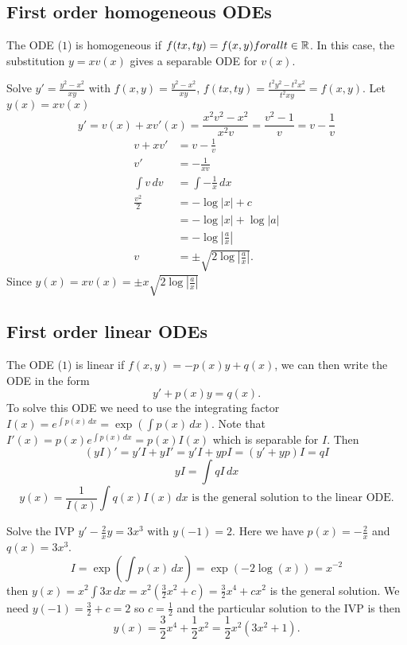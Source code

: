 \documentclass[10pt, a4paper]{article}
\begin{document}
\subsection{First order homogeneous ODEs}
The ODE ($1$) is homogeneous if $f(tx, ty) = f(x,  y)\\forall t \in \mathbb{R}$.
In this case,
the substitution $y = xv(x)$ gives a separable ODE for $v(x)$.

\begin{example}
    Solve $y' = \frac{y ^ 2 - x ^ 2}{xy}$
    with $f(x, y) = \frac{y ^ 2 - x ^ 2}{xy}$, $f(tx, ty) = \frac{t ^ 2y ^ 2 - t ^ 2 x ^ 2}{t ^ 2xy} = f(x, y)$.
    Let $y(x) = xv(x)$
    \[
    y' = v(x) + xv'(x) = \frac{x ^ 2 v ^ 2 - x ^ 2}{x ^ 2 v} = \frac{v ^ 2 - 1}{v} = v - \frac{1}{v}
    \]
    \begin{align*}
        v + xv' &= v - \frac{1}{v} \\
        v' &= -\frac{1}{xv} \\
        \int v\,dv &= \int -\frac{1}{x}\,dx \\
        \frac{v ^ 2}{2} &= -\log|x| + c \\
        &= -\log|x| + \log|a| \\
        &= -\log\left|\frac{a}{x}\right| \\
        v &= \pm\sqrt{2\log\left|\frac{a}{x}\right|}.
    \end{align*}
    Since $y(x) = xv(x) = \pm x\sqrt{2\log\left|\frac{a}{x}\right|}$
\end{example}

\subsection{First order linear ODEs}
The ODE ($1$) is linear if $f(x, y) = -p(x)y + q(x)$,
we can then write the ODE in the form
\[
y' + p(x)y = q(x).
\]
To solve this ODE we need to use the integrating factor $I(x) = e ^ {\int p(x)\,dx} = \exp\left(\int p(x)\,dx\right)$.
Note that $I'(x) = p(x)e ^ {\int p(x)\,dx} = p(x)I(x)$ which is separable for $I$.
Then
\[
(yI)' = y'I + yI' = y'I + ypI = (y' + yp)I = qI
\]
\[
yI = \int qI\,dx
\]
\[
y(x) = \frac{1}{I(x)}\int q(x)I(x)\,dx\text{ is the general solution to the linear ODE}.
\]
\begin{example}
    Solve the IVP $y' - \frac{2}{x}y = 3x ^ 3$ with $y(-1) = 2$.
    Here we have $p(x) = -\frac{2}{x}$ and $q(x) = 3x ^ 3$.
    \[
    I = \exp\left(\int p(x)\,dx\right) = \exp(-2\log(x)) = x ^ {-2}
    \]
    then $y(x) = x ^ 2\int 3x\,dx = x ^ 2 \left(\frac{3}{2}x ^ 2 + c\right) = \frac{3}{2}x ^ 4 + cx ^ 2$ is the general solution.
    We need $y(-1) = \frac{3}{2} + c = 2$ so $c = \frac{1}{2}$ and the particular solution to the IVP is then
    \[
    y(x) = \frac{3}{2}x ^ 4 + \frac{1}{2}x ^ 2 = \frac{1}{2}x ^ 2(3x ^ 2 + 1).
    \]
\end{example}
\end{document}
